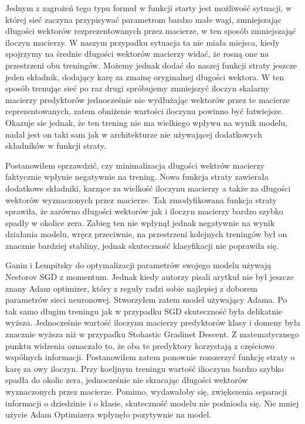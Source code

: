 \documentclass{article}
\begin{document}
\par
Jednym z zagrożeń tego typu formuł w funkcji starty jest możliwość sytuacji, w której sieć zaczyna przypisywać parametrom bardzo małe wagi, zmniejszając długości wektorów rezprezentowanych przez macierze, w ten sposób zmniejszająć iloczyn macierzy. W naszym przypadku sytuacja ta nie miała miejsca, kiedy spojrzymy na średnie długości wektorów macierzy widać, że rosną one na przestrzeni obu treningów. Możemy jednak dodać do naszej funkcji straty jeszcze jeden składnik, dodający karę za zmainę oryginalnej długości wektora. W ten sposób trenując sieć po raz drugi spróbujemy zmniejszyć iloczyn skalarny macierzy predyktorów jednocześnie nie wydłużając wektorów przez te macierze reprezentowanych, zatem obniżenie wartości iloczynu powinno być łatwiejsze. Okazuje sie jednak, że ten trening nie ma wielkiego wpływu na wynik modelu, nadal jest on taki sam jak w architekturze nie używającej dodatkowych składników w funkcji straty.
\par
Postanowiłem sprzawdzić, czy minimalizacja długości wektrów macierzy faktycznie wpłynie negatywnie na trening. Nowa funkcja straty zawierała dodatkowe składniki, karzące za wielkość iloczynu macierzy a także za długości wektorów wyznaczonych przez macierze. Tak zmodyfikowana funkcja straty sprawiła, że zarówno długości wektorów jak i iloczyn macierzy bardzo szybko spadły w okolice zera. Zabieg ten nie wpłynął jednak negatywnie na wynik działania modelu, wręcz przeciwnie, na przestrzeni kolejnych treningów był on znacznie bardziej stabliny, jednak skuteczność klasyfikacji nie poprawiła się.
\par
Ganin i Lempitsky do optymalizacji parametrów swojego modelu używają Nestorov SGD z momentum. Jednak kiedy autorzy pisali arytkuł nie był jeszcze znany Adam optimizer, który z reguły radzi sobie najlepiej z doborem parametrów sieci neuronowej. Stworzyłem zatem model używający Adama. Po tak samo długim treningu jak w przypadku SGD skuteczność była delikatnie wyższa. Jednocześnie wartość iloczynu macierzy predyktorów klasy i domeny była znacznie wyższa niż w przypadku Stohastic Gradinet Descent. Z matematycznego punktu widzenia oznaczało to, że oba te predyktory korzystają z częściowo wspólnych informacji. Postanowiłem zatem ponownie rozszerzyć funkcję straty o karę za owy iloczyn. Przy koeljnym treningu wartość ilioczynu bardzo szybko spadła do okolic zera, jednocześnie nie skracając długości wektorów wyznaczonych przez macierze. Pomimo, wydawałoby się, zwiększenia separacji informacji o dziedzinie i o klasie, skuteczność modelu nie podniosła się. Nie mniej użycie Adam Optimizera wpłynęło pozytywnie na model.
\end{document}
